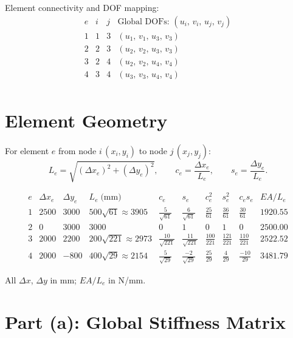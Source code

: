 \documentclass[11pt, a4paper]{article}
\begin{document}
\noindent Element connectivity and DOF mapping:
\[
\begin{array}{c|cc|l}
e & i & j & \text{Global DOFs: } (u_i,\,v_i,\,u_j,\,v_j) \\
\hline
1 & 1 & 3 & (u_1,\,v_1,\,u_3,\,v_3) \\
2 & 2 & 3 & (u_2,\,v_2,\,u_3,\,v_3) \\
3 & 2 & 4 & (u_2,\,v_2,\,u_4,\,v_4) \\
4 & 3 & 4 & (u_3,\,v_3,\,u_4,\,v_4) \\
\end{array}
\]

\section{Element Geometry}\label{sec:geometry}

For element $e$ from node $i\,(x_i,y_i)$ to node $j\,(x_j,y_j)$:
\[
L_e = \sqrt{(\Delta x_e)^2+(\Delta y_e)^2},\qquad
c_e = \frac{\Delta x_e}{L_e},\qquad
s_e = \frac{\Delta y_e}{L_e}.
\]

\begingroup\small
\[
\begin{array}{c|rr|c|cc|ccc|c}
e & \Delta x_e & \Delta y_e & L_e\;\text{(mm)} & c_e & s_e & c_e^2 & s_e^2 & c_e s_e & EA/L_e\\
\hline
1 & 2500 & 3000 & 500\sqrt{61}\approx3905 & \tfrac{5}{\sqrt{61}} & \tfrac{6}{\sqrt{61}} & \tfrac{25}{61} & \tfrac{36}{61} & \tfrac{30}{61} & 1920.55 \\[4pt]
2 & 0 & 3000 & 3000 & 0 & 1 & 0 & 1 & 0 & 2500.00 \\[4pt]
3 & 2000 & 2200 & 200\sqrt{221}\approx2973 & \tfrac{10}{\sqrt{221}} & \tfrac{11}{\sqrt{221}} & \tfrac{100}{221} & \tfrac{121}{221} & \tfrac{110}{221} & 2522.52 \\[4pt]
4 & 2000 & -800 & 400\sqrt{29}\approx2154 & \tfrac{5}{\sqrt{29}} & \tfrac{-2}{\sqrt{29}} & \tfrac{25}{29} & \tfrac{4}{29} & \tfrac{-10}{29} & 3481.79
\end{array}
\]
\endgroup

All $\Delta x$, $\Delta y$ in mm; $EA/L_e$ in N/mm.

\section{Part (a): Global Stiffness Matrix}\label{sec:parta}
\end{document}
